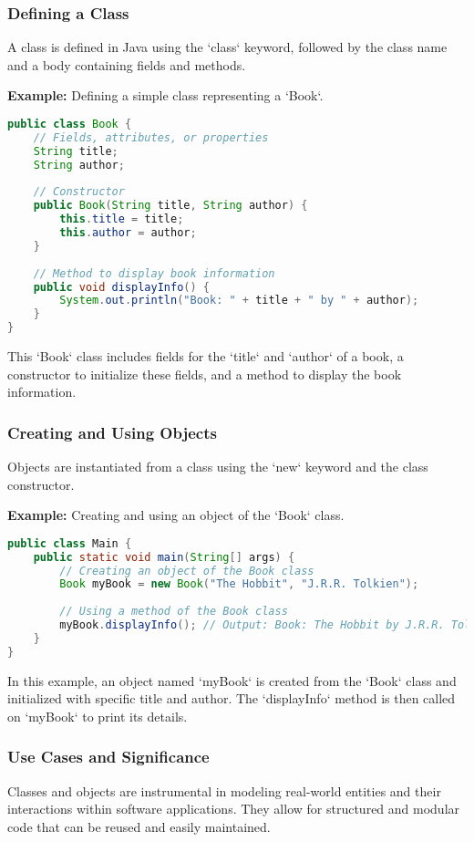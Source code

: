 \documentclass{article}
\begin{document}
\subsubsection{Defining a Class}
A class is defined in Java using the `class` keyword, followed by the class name and a body containing fields and methods.

\textbf{Example:} Defining a simple class representing a `Book`.

\begin{lstlisting}[language=Java]
public class Book {
    // Fields, attributes, or properties
    String title;
    String author;
    
    // Constructor
    public Book(String title, String author) {
        this.title = title;
        this.author = author;
    }
    
    // Method to display book information
    public void displayInfo() {
        System.out.println("Book: " + title + " by " + author);
    }
}
\end{lstlisting}

This `Book` class includes fields for the `title` and `author` of a book, a constructor to initialize these fields, and a method to display the book information.

\subsubsection{Creating and Using Objects}
Objects are instantiated from a class using the `new` keyword and the class constructor.

\textbf{Example:} Creating and using an object of the `Book` class.

\begin{lstlisting}[language=Java]
public class Main {
    public static void main(String[] args) {
        // Creating an object of the Book class
        Book myBook = new Book("The Hobbit", "J.R.R. Tolkien");
        
        // Using a method of the Book class
        myBook.displayInfo(); // Output: Book: The Hobbit by J.R.R. Tolkien
    }
}
\end{lstlisting}

In this example, an object named `myBook` is created from the `Book` class and initialized with specific title and author. The `displayInfo` method is then called on `myBook` to print its details.

\subsubsection{Use Cases and Significance}
Classes and objects are instrumental in modeling real-world entities and their interactions within software applications. They allow for structured and modular code that can be reused and easily maintained.
\end{document}
